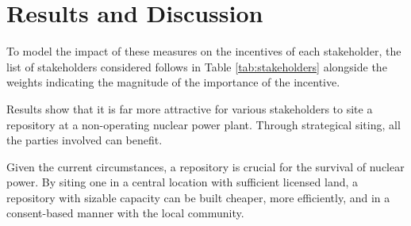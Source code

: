 \section{Results and Discussion} 

To model the impact of these measures on the incentives of each stakeholder, 
the list of stakeholders considered follows in Table \ref{tab:stakeholders} 
alongside the weights indicating the magnitude of the importance of the incentive.
 
\begin{table}[h]
\centering
\caption {Metrics and Weight for Each Stakeholder}
\label{tab:stakeholders}
\end{table}

Results show that it is far more attractive for various stakeholders to 
site a repository at a non-operating nuclear power plant. Through strategical
siting, all the parties involved can benefit.

Given the current circumstances, a repository is crucial for the survival of nuclear
power. By siting one in a central location with sufficient licensed land,
a repository with sizable capacity can be built cheaper, more efficiently, and 
in a consent-based manner with the local community. 

